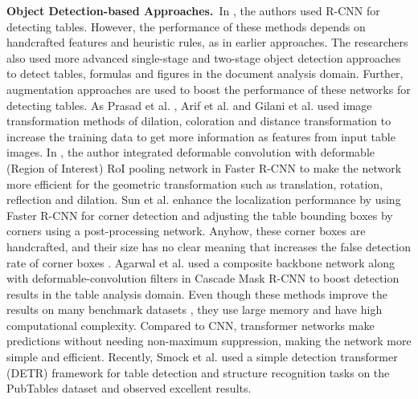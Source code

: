 \documentclass[sn-mathphys]{sn-jnl}\jyear{2021}\theoremstyle{thmstyleone}\newtheorem{theorem}{Theorem}\newtheorem{proposition}[theorem]{Proposition}\theoremstyle{thmstyletwo}\newtheorem{example}{Example}\newtheorem{remark}{Remark}\theoremstyle{thmstylethree}\newtheorem{definition}{Definition}\usepackage{amsmath}
\begin{document}
\noindent\textbf {Object Detection-based Approaches.}~In \cite{Yi77, Oliveira565}, the authors used R-CNN \cite{rcnn13} for detecting tables. However, the performance of these methods depends on handcrafted features and heuristic rules, as in earlier approaches. The researchers \cite{Xinyi89, Saha43, Ayan29, Agarwal52} also used more advanced single-stage \cite{Joseph15,retina34} and two-stage  \cite{fast15, faster23, mask86, Cai56} object detection approaches to detect tables, formulas and figures in the document analysis domain. Further, augmentation approaches are used to boost the performance of these networks for detecting tables. As Prasad et al. \cite{Ayan29}, Arif et al. \cite{arif48} and Gilani et al. \cite{Azka62} used image transformation methods of dilation, coloration and distance transformation to increase the training data to get more information as features from input table images. In \cite{Sidd32}, the author integrated deformable convolution with deformable (Region of Interest) RoI pooling network in Faster R-CNN \cite{faster23} to make the network more efficient for the geometric transformation such as translation, rotation, reflection and dilation. Sun et al. \cite{FasterTD} enhance the localization performance by using Faster R-CNN \cite{faster23} for corner detection and adjusting the table bounding boxes by corners using a post-processing network. Anyhow, these corner boxes are handcrafted, and their size has no clear meaning that increases the false detection rate of corner boxes \cite{FasterTD}. Agarwal et al. \cite{Agarwal52} used a composite backbone network along with deformable-convolution filters in Cascade Mask R-CNN \cite{Cai56} to boost detection results in the table analysis domain. Even though these methods improve the results on many benchmark datasets \cite{icdar19, PubLayNet3, iiit13k, icdar13, icdar17, tablebank8, Paliw9}, they use large memory and have high computational complexity. Compared to CNN, transformer networks make predictions without needing non-maximum suppression, making the network more simple and efficient. Recently, Smock et al. \cite {pubtables5} used a simple detection transformer (DETR) framework for table detection and structure recognition tasks on the PubTables dataset and observed excellent results.\\  
\end{document}
